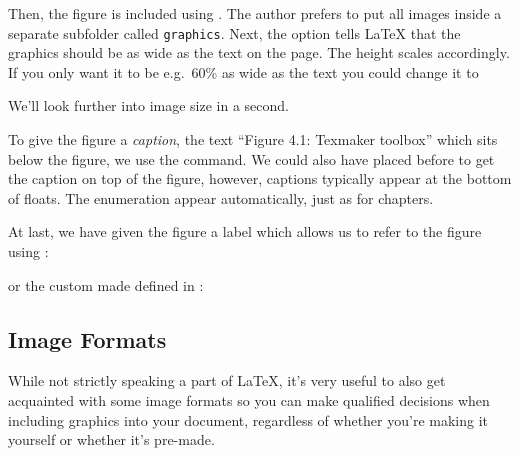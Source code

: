 {%

\index{\latexin{\textwidth}}
Then, the figure is included using . The author prefers to put all images inside a separate subfolder called \verb|graphics|. Next, the option  tells \LaTeX{} that the graphics should be as wide as the text on the page. The height scales accordingly. If you only want it to be e.g.\ 60\% as wide as the text you could change it to

\noindent We'll look further into image size in a second.

\index{\latexin{\caption}}
To give the figure a \emph{caption}, the text ``Figure 4.1: Texmaker toolbox'' which sits below the figure, we use the \latexin{\caption} command. We could also have placed \latexin{\caption} before  to get the caption on top of the figure, however, captions typically appear at the bottom of floats. The enumeration appear automatically, just as for chapters.

At last, we have given the figure a label which allows us to refer to the figure using \latexin{\ref}:

\noindent or the custom made  defined in :

\subsection{Image Formats}
While not strictly speaking a part of \LaTeX{}, it's very useful to also get acquainted with some image formats so you can make qualified decisions when including graphics into your document, regardless of whether you're making it yourself or whether it's pre-made.

}
